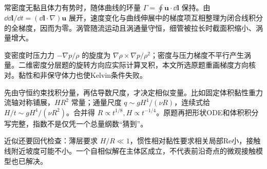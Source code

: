 常密度无黏且体力有势时，随体曲线的环量 $\Gamma=\oint\mathbf u\cdot\dd\mathbf l$ 保持。由 $\dd\dd\mathbf l/\dd t=(\dd\mathbf l\cdot\nabla)\mathbf u$ 展开，速度变化与曲线伸展中的梯度项互相整理为闭合线积分的全梯度，因而为零。涡管随流运动且涡通量守恒，细管被拉长时截面积缩小、涡量增大。

变密度时压力力 $-\nabla p/\rho$ 的旋度为 $\nabla\rho\times\nabla p/\rho^2$；密度与压力梯度不平行产生涡量。二维密度分层题的旋转方向应实际计算叉积，本文所选原题重画梯度方向核对。黏性和非保守体力也使Kelvin条件失败。

先由守恒约束找积分量，再估导数尺度，才决定相似变量。比如固定体积黏性重力流轴对称铺展，$H R^2$ 常量；通量尺度 $q\sim gH^4/(\nu R)$，连续式给 $H/t\sim gH^4/(\nu R^2)$。合并得 $R\propto t^{1/8},H\propto t^{-1/4}$。原题再把形状ODE和体积积分写完整，指数不是仅凭一个总量纲数“猜到”。

近似还要回代检查：薄层要求 $H/R\ll1$，惯性相对黏性要求相关局部Re小，接触线附近坡度可能不小。一个自相似解在主体区成立，不代表前沿奇点的微观接触模型也已解决。
